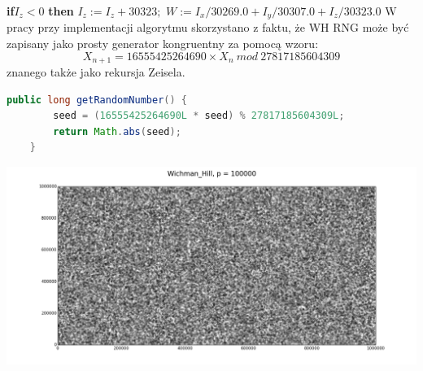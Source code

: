 \documentclass[a4paper, 11pt]{article} %
\begin{document}
\noindent \textbf{if}$I_z < 0$ \textbf{then}
\newline \indent	$I_z := I_z + 30323;$
\noindent \newline $W := I_x/30269.0 + I_y/30307.0 + I_z/30323.0$
\newline W pracy przy implementacji algorytmu skorzystano z faktu, że WH RNG może być zapisany jako prosty generator kongruentny za pomocą wzoru: 
$$X_{n+1} = 16555425264690 \times X_n\ mod\ 27817185604309 $$
znanego także jako rekursja Zeisela.

\begin{lstlisting}[style=mystyle, language=java, frame=single, caption = Generowanie następnej liczby pseudolosowej przez algorytm Wichmanna-Hilla na podstawie rekursji Zeisela.]
    public long getRandomNumber() {
        seed = (16555425264690L * seed) % 27817185604309L;
        return Math.abs(seed);
    }
\end{lstlisting}
\includegraphics[width=\linewidth]{img/wh-1.png}
\end{document}
